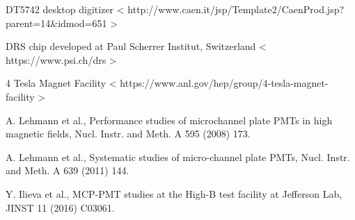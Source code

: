 \documentclass[preprint,5p]{elsarticle}
\begin{document}
\begin{thebibliography}{99}
DT5742 desktop digitizer < http://www.caen.it/jsp/Template2/CaenProd.jsp?parent=14{\&}idmod=651 >

DRS chip developed at Paul Scherrer Institut, Switzerland < https://www.psi.ch/drs >

4 Tesla Magnet Facility < https://www.anl.gov/hep/group/4-tesla-magnet-facility >

A. Lehmann et al., Performance studies of microchannel plate PMTs in high magnetic fields, Nucl. Instr. and Meth. A 595 (2008) 173.

A. Lehmann et al., Systematic studies of micro-channel plate PMTs, Nucl. Instr. and Meth. A 639 (2011) 144.

Y. Ilieva et al., MCP-PMT studies at the High-B test facility at Jefferson Lab, JINST 11 (2016) C03061.

\end{thebibliography}
\end{document}
